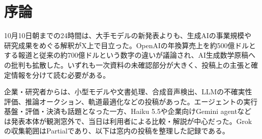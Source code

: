 \section*{序論}
10月10日朝までの24時間は、大手モデルの新発表よりも、生成AIの事業規模や研究成果をめぐる解釈がX上で目立った。OpenAIの年換算売上を約500億ドルとする報道と従来の約700億ドルという数字の違いが議論され、AI生成数学原稿への批判も拡散した。いずれも一次資料の未確認部分が大きく、投稿上の主張と確定情報を分けて読む必要がある。

企業・研究者からは、小型モデルや文書処理、合成音声検出、LLMの不確実性評価、推論オークション、軌道最適化などの投稿があった。エージェントの実行基盤・評価・決済も話題となった一方、Haiku 5.5や企業向けGemini agentなどは発表本体が観測窓外で、当日は利用者による比較・解説が中心だった。Grokの収集範囲はPartialであり、以下は窓内の投稿を整理した記録である。
